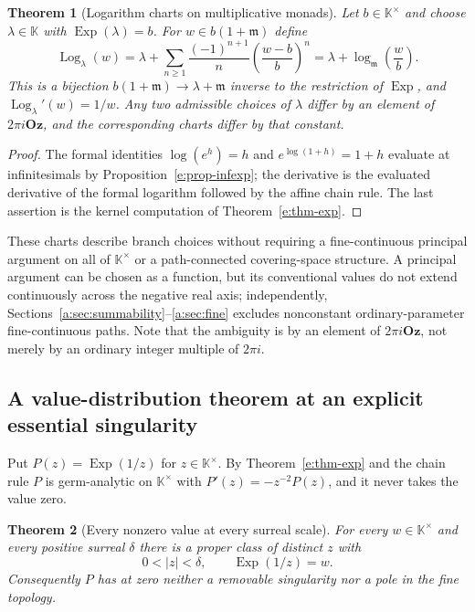 \documentclass[11pt,a4paper]{article}
\numberwithin{equation}{section}
\newtheorem{theorem}{Theorem}[section]
\theoremstyle{definition}
\theoremstyle{remark}
\theoremstyle{plain}
\newcommand{\K}{\mathbb K}
\newcommand{\Oz}{\mathbf{Oz}}
\newcommand{\mm}{\mathfrak m}
\DeclareMathOperator{\Log}{Log}
\DeclareMathOperator{\Exp}{Exp}
\newcommand{\abs}[1]{\lvert #1\rvert}
\begin{document}
\begin{theorem}[Logarithm charts on multiplicative monads]
\label{e:thm-logcharts}
Let $b\in\K^{\times}$ and choose $\lambda\in\K$ with $\Exp(\lambda)=b$.
For $w\in b(1+\mm)$ define
\[
 \Log_\lambda(w)=\lambda+\sum_{n\ge1}\frac{(-1)^{n+1}}{n}
   \left(\frac{w-b}{b}\right)^{n}
 =\lambda+\log_{\mm}\!\left(\frac wb\right).
\]
This is a bijection $b(1+\mm)\to\lambda+\mm$ inverse to the restriction of
$\Exp$, and $\Log_\lambda'(w)=1/w$.  Any two admissible choices of
$\lambda$ differ by an element of $2\pi i\Oz$, and the corresponding charts
differ by that constant.
\end{theorem}

\begin{proof}
The formal identities $\log(e^h)=h$ and $e^{\log(1+h)}=1+h$ evaluate at
infinitesimals by Proposition~\ref{e:prop-infexp}; the derivative is the
evaluated derivative of the formal logarithm followed by the affine chain
rule.  The last assertion is the kernel computation of
Theorem~\ref{e:thm-exp}.
\end{proof}

These charts describe branch choices without requiring a
fine-continuous principal argument on all of $\K^\times$ or a
path-connected covering-space structure. A principal argument can be
chosen as a function, but its conventional values do not extend
continuously across the negative real axis; independently, Sections~\ref{a:sec:summability}--\ref{a:sec:fine}
excludes nonconstant ordinary-parameter fine-continuous paths.  Note that the ambiguity is by an element of
$2\pi i\Oz$, not merely by an ordinary integer multiple of $2\pi i$.

\subsection{A value-distribution theorem at an explicit essential
singularity}\label{e:sec-picard}

Put $P(z)=\Exp(1/z)$ for $z\in\K^{\times}$.  By
Theorem~\ref{e:thm-exp} and the chain rule $P$ is germ-analytic on
$\K^{\times}$ with $P'(z)=-z^{-2}P(z)$, and it never takes the value zero.

\begin{theorem}[Every nonzero value at every surreal scale]
\label{e:thm-picard}
For every $w\in\K^{\times}$ and every positive surreal $\delta$ there is a
\emph{proper class} of distinct $z$ with
\[
 0<\abs z<\delta,\qquad \Exp(1/z)=w .
\]
Consequently $P$ has at zero neither a removable singularity nor a pole in
the fine topology.
\end{theorem}
\end{document}
